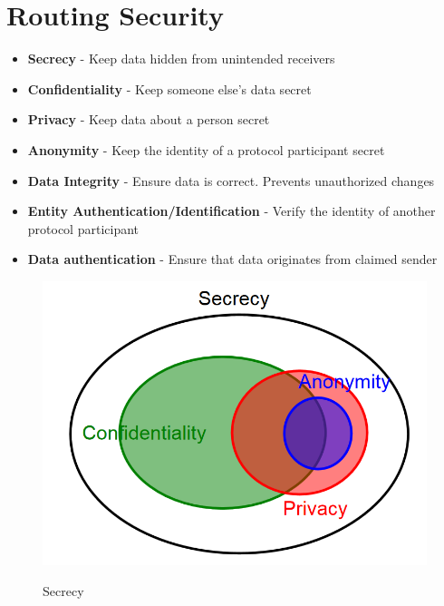 \section{Routing Security}
\begin{itemize}
\item \textbf{Secrecy} - Keep data hidden from unintended receivers
\item \textbf{Confidentiality} - Keep someone else's data secret
\item \textbf{Privacy} - Keep data about a person secret
\item \textbf{Anonymity} - Keep the identity of a protocol participant secret
\item \textbf{Data Integrity} - Ensure data is correct. Prevents unauthorized changes
\item \textbf{Entity Authentication/Identification} - Verify the identity of another protocol participant
\item \textbf{Data authentication} - Ensure that data originates from claimed sender
\end{itemize}
\begin{figure}[H]
\centering
\includegraphics[width=.4\textwidth]{images/secrecy.PNG}
\label{secrecy}
\caption{Secrecy}
\end{figure}

